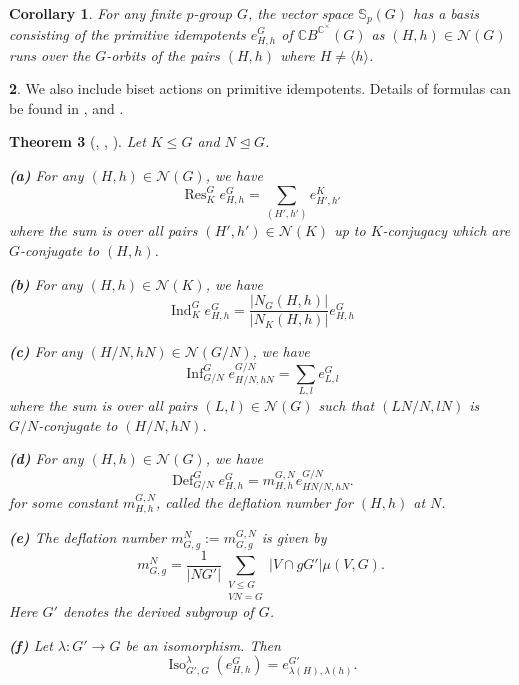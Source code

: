 \documentclass[12pt]{article}
\theoremstyle{plain}
\newtheorem{theorem}{Theorem}[section]
\newtheorem{corollary}[theorem]{Corollary}
\theoremstyle{definition}
\newtheorem{nothing}[theorem]{}
\newcommand{\MonG}{\mathbb C B^{\mathbb C^\times}(G)}
\newcommand{\scp}{\mathbb S_p}
\newcommand{\ind}{\operatorname{Ind}}
\newcommand{\res}{\operatorname{Res}}
\newcommand{\defl}{\operatorname{Def}}
\newcommand{\infl}{\operatorname{Inf}}
\newcommand{\iso}{\operatorname{Iso}}
\begin{document}
\begin{corollary}
    For any finite $p$-group $G$, the  vector space $\scp(G)$ has a basis consisting of the primitive idempotents $e_{H, h}^G$ of $\MonG$ as $(H, h)\in \mathcal N(G)$ runs over the $G$-orbits of the pairs $(H, h)$ where $H\not = \langle h\rangle$. 
\end{corollary}

\begin{nothing}
    We also include biset actions on primitive idempotents. Details of formulas can be found in \cite{Bar}, \cite{BoYi} and \cite{CoYi}.
\end{nothing}
\begin{theorem}[\cite{Bar}, \cite{BoYi}, \cite{CoYi}]\label{thm:bisetactions} 
    Let $K\le G$ and $N\unlhd G$. 
    
    \textbf{(a)} For any $(H,h)\in\mathcal{N}(G)$, we have
    \[
    \res^G_K e_{H, h}^G = \sum_{(H',h')} e_{H', h'}^K
    \]
    where the sum is over all pairs $(H', h')\in\mathcal{N}(K)$ up to $K$-conjugacy which are $G$-conjugate to $(H,h)$.

    \smallskip

    \textbf{(b)} For any $(H, h)\in\mathcal{N}(K)$, we have
    \[
    \ind_K^G e_{H, h}^G = \frac{|N_G(H,h)|}{|N_K(H,h)|}e_{H,h}^G
    \]
    \smallskip
  
    \textbf{(c)} For any $(H/N, hN)\in\mathcal{N}(G/N)$, we have
    \[
    \infl_{G/N}^G e_{H/N,hN}^{G/N} = \sum_{L, l}e_{L, l}^G
    \]
    where the sum is over all pairs $(L,l)\in\mathcal{N}(G)$ such that $(LN/N, lN)$ is $G/N$-conjugate to $(H/N, hN)$.

    \smallskip

    \textbf{(d)} For any $(H, h)\in\mathcal{N}(G)$, we have
    \[
    \defl^G_{G/N} e^G_{H, h} = m_{H, h}^{G, N} e^{G/N}_{HN/N, hN}.
    \]
    for some constant $m_{H, h}^{G, N}$, called the deflation number for $(H,h)$ at $N$. 

    \smallskip

    \textbf{(e)} The deflation number $m_{G, g}^N:= m_{G, g}^{G, N}$ is given by
    \[
    m_{G, g}^N = \frac{1}{|NG'|}\sum_{\substack{V\le G\\ VN = G}} |V\cap gG'|\mu(V, G).
    \]
    Here $G'$ denotes the derived subgroup of $G$.

    \smallskip
    
    \textbf{(f)} Let $\lambda:G' \to G$ be an isomorphism. Then
    \[
    \iso_{G', G}^\lambda (e_{H, h}^G) = e_{\lambda(H), \lambda(h)}^{G'}.
    \]
    
\end{theorem}
\end{document}
